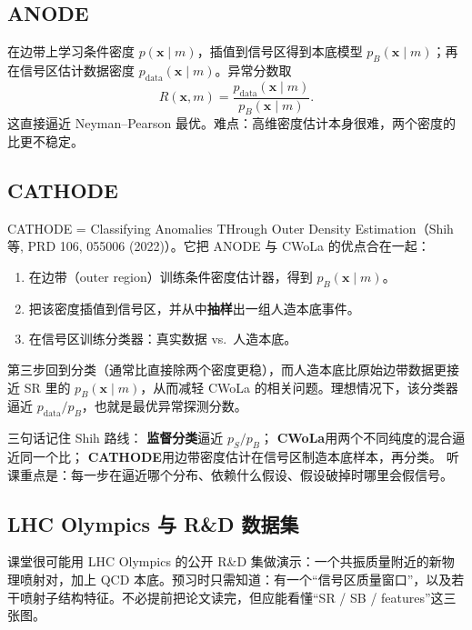 \documentclass[11pt,a4paper]{article}
\theoremstyle{definition}
\theoremstyle{plain}
\theoremstyle{remark}
\begin{document}
\subsection{ANODE}

在边带上学习条件密度 $p(\mathbf{x}\mid m)$，插值到信号区得到本底模型 $p_B(\mathbf{x}\mid m)$；再在信号区估计数据密度 $p_{\mathrm{data}}(\mathbf{x}\mid m)$。异常分数取
\begin{equation}
  R(\mathbf{x},m)=\frac{p_{\mathrm{data}}(\mathbf{x}\mid m)}{p_B(\mathbf{x}\mid m)}.
\end{equation}
这直接逼近 Neyman--Pearson 最优。难点：高维密度估计本身很难，两个密度的比更不稳定。

\subsection{CATHODE}

CATHODE = Classifying Anomalies THrough Outer Density Estimation（Shih 等, PRD 106, 055006 (2022)）。它把 ANODE 与 CWoLa 的优点合在一起：

\begin{enumerate}[leftmargin=1.6em]
  \item 在边带（outer region）训练条件密度估计器，得到 $p_B(\mathbf{x}\mid m)$。
  \item 把该密度插值到信号区，并从中\textbf{抽样}出一组人造本底事件。
  \item 在信号区训练分类器：真实数据 vs.\ 人造本底。
\end{enumerate}

第三步回到分类（通常比直接除两个密度更稳），而人造本底比原始边带数据更接近 SR 里的 $p_B(\mathbf{x}\mid m)$，从而减轻 CWoLa 的相关问题。理想情况下，该分类器逼近 $p_{\mathrm{data}}/p_B$，也就是最优异常探测分数。

\begin{keybox}
三句话记住 Shih 路线：
\textbf{监督分类}逼近 $p_S/p_B$；
\textbf{CWoLa}用两个不同纯度的混合逼近同一个比；
\textbf{CATHODE}用边带密度估计在信号区制造本底样本，再分类。
听课重点是：每一步在逼近哪个分布、依赖什么假设、假设破掉时哪里会假信号。
\end{keybox}

\subsection{LHC Olympics 与 R\&D 数据集}

课堂很可能用 LHC Olympics 的公开 R\&D 集做演示：一个共振质量附近的新物理喷射对，加上 QCD 本底。预习时只需知道：有一个``信号区质量窗口''，以及若干喷射子结构特征。不必提前把论文读完，但应能看懂``SR / SB / features''这三张图。
\end{document}
